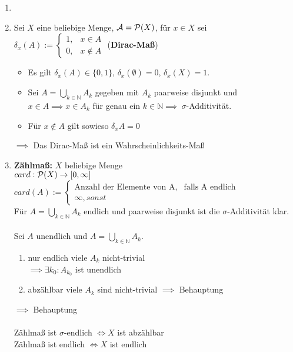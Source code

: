   \begin{example}
    \begin{enumerate}
      \item[]
      \item Sei $X$ eine beliebige Menge, $\mathcal{A} = \mathcal{P}(X)$, für $x \in X$ sei $\delta_x(A) := \begin{cases}1, & x \in A\\0, & x \notin A\end{cases}$ (\textbf{Dirac-Maß})
            \begin{itemize}
              \item Es gilt $\delta_x(A) \in \{0,1\}$, $\delta_x(\emptyset) = 0$, $\delta_x(X) = 1$.
              \item Sei $A = \bigcup\limits_{k \in \mathbb{N}} A_k$ gegeben mit $A_k$ paarweise disjunkt und $x \in A \implies x \in A_k$ für genau ein $k \in \mathbb{N} \implies\ \sigma$-Additivität.
              \item Für $x \notin A$ gilt sowieso $\delta_x{A} = 0$
            \end{itemize}
            $\implies$ Das Dirac-Maß ist ein Wahrscheinlichkeits-Maß
      \item \textbf{Zählmaß:} $X$ beliebige Menge \\
            $card: \mathcal{P}(X) \to [0, \infty]$\\
            $card(A) := \begin{cases}\text{Anzahl der Elemente von A}, & \text{falls A endlich}\\\infty, sonst\end{cases}$\\
            Für $A = \bigcup\limits_{k\in \mathbb{N}}A_k$ endlich und paarweise disjunkt ist die $\sigma$-Additivität klar.\\
            \\
            Sei $A$ unendlich und $A = \bigcup\limits_{k\in \mathbb{N}}A_k$.
            \begin{enumerate}
              \item nur endlich viele $A_k$ nicht-trivial\\
                    $\implies \exists k_0: A_{k_0}$ ist unendlich
              \item abzählbar viele $A_k$ sind nicht-trivial $\implies$ Behauptung
            \end{enumerate}
            $\implies$ Behauptung\\
            \\
            Zählmaß ist $\sigma$-endlich $\Leftrightarrow X$ ist abzählbar\\
            Zählmaß ist endlich $\Leftrightarrow X$ ist endlich
    \end{enumerate}
  \end{example}

